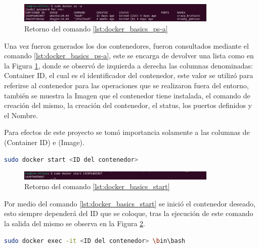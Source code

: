 \begin{figure}[h!]
    \centering
    \includegraphics[width=0.85\textwidth]{fig/especifico_2/retornos_de_comandos/sudo_docker_ps_a.pdf}
    \caption{Retorno del comando \ref{lst:docker_basics_ps-a}}
    \label{fig:sudo_docker_ps_a}
\end{figure}

Una vez fueron generados los dos contenedores, fueron consultados mediante el comando \ref{lst:docker_basics_ps-a}, este se encarga de devolver una lista como en la Figura \ref{fig:sudo_docker_ps_a}, donde se observó de izquierda a derecha las columnas denominadas: Container ID, el cual es el identificador del contenedor, este valor se utilizó para referirse al contenedor para las operaciones que se realizaron fuera del entorno, también se muestra la Imagen que el contenedor tiene instalada, el comando de creación del mismo, la creación del contenedor, el status, los puertos definidos y el Nombre.

Para efectos de este proyecto se tomó importancia solamente a las columnas de (Container ID) e (Image).

\begin{lstlisting}[language=bash, caption={Iniciar un contenedor, Docker}, label=lst:docker_basics_start]
    sudo docker start <ID del contenedor>
\end{lstlisting}

\begin{figure}[h!]
    \centering
    \includegraphics[width=0.85\textwidth]{fig/especifico_2/retornos_de_comandos/sudo_docker_start.pdf}
    \caption{Retorno del comando \ref{lst:docker_basics_start}}
    \label{fig:sudo_docker_start}
\end{figure}

Por medio del comando \ref{lst:docker_basics_start} se inició el contenedor deseado, esto siempre dependerá del ID que se coloque, tras la ejecución de este comando la salida del mismo se observa en la Figura \ref{fig:sudo_docker_start}.

\begin{lstlisting}[language=bash, caption={Ingresar a un contenedor, Docker}, label=lst:docker_basics_init]
    sudo docker exec -it <ID del contenedor> \bin\bash
\end{lstlisting}

